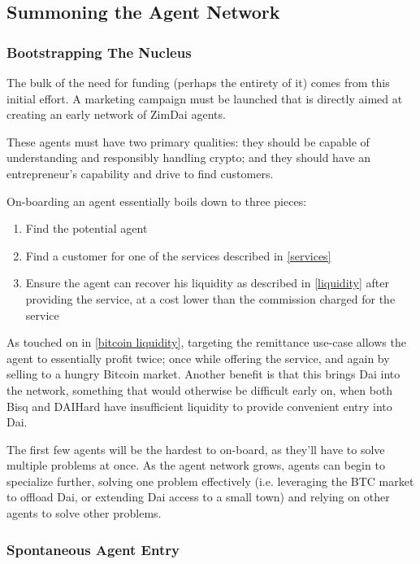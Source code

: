 \documentclass{article}
\begin{document}
\subsection{Summoning the Agent Network} \label{summoning}

\subsubsection{Bootstrapping The Nucleus} \label{bootstrapping}

The bulk of the need for funding (perhaps the entirety of it) comes from this initial effort. A marketing campaign must be launched that is directly aimed at creating an early network of ZimDai agents.

These agents must have two primary qualities: they should be capable of understanding and responsibly handling crypto; and they should have an entrepreneur's capability and drive to find customers.

On-boarding an agent essentially boils down to three pieces:

\begin{enumerate}
	\item Find the potential agent
	\item Find a customer for one of the services described in \ref{services}
	\item Ensure the agent can recover his liquidity as described in \ref{liquidity} after providing the service, at a cost lower than the commission charged for the service
\end{enumerate}

As touched on in \ref{bitcoin liquidity}, targeting the remittance use-case allows the agent to essentially profit twice; once while offering the service, and again by selling to a hungry Bitcoin market. Another benefit is that this brings Dai into the network, something that would otherwise be difficult early on, when both Bisq and DAIHard have insufficient liquidity to provide convenient entry into Dai.

The first few agents will be the hardest to on-board, as they'll have to solve multiple problems at once. As the agent network grows, agents can begin to specialize further, solving one problem effectively (i.e. leveraging the BTC market to offload Dai, or extending Dai access to a small town) and relying on other agents to solve other problems.

\subsubsection{Spontaneous Agent Entry} \label{spontaneous}
\end{document}
